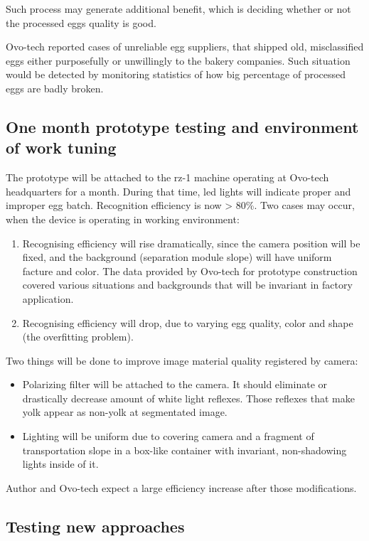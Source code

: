 \documentclass[12pt,twoside,a4paper]{article}
\begin{document}
Such process may generate additional benefit, which is deciding whether or not the processed eggs quality is good.

Ovo-tech reported cases of unreliable egg suppliers, that shipped old, misclassified eggs either purposefully or unwillingly to the bakery companies.
Such situation would be detected by monitoring statistics of how big percentage of processed eggs are badly broken.
\subsection{One month prototype testing and environment of work tuning}

The prototype will be attached to the rz-1 machine operating at Ovo-tech headquarters for a month.
During that time, led lights will indicate proper and improper egg batch.
Recognition efficiency is now > 80\%. Two cases may occur, when the device is operating in working environment:
\begin{enumerate}
\item Recognising efficiency will rise dramatically, since the camera position will be fixed, and the background (separation module slope) will have uniform facture and color.
The data provided by Ovo-tech for prototype construction covered various situations and backgrounds that will be invariant in factory application.
\item Recognising efficiency will drop, due to varying egg quality, color and shape (the overfitting problem).
\end{enumerate}

Two things will be done to improve image material quality registered by camera:
\begin{itemize}
\item Polarizing filter will be attached to the camera.
It should eliminate or drastically decrease amount of white light reflexes.
Those reflexes that make yolk appear as non-yolk at segmentated image.
\item Lighting will be uniform due to covering camera and a fragment of transportation slope in a box-like container with invariant, non-shadowing lights inside of it.
\end{itemize}

Author and Ovo-tech expect a large efficiency increase after those modifications.
\subsection{Testing new approaches}
\end{document}
